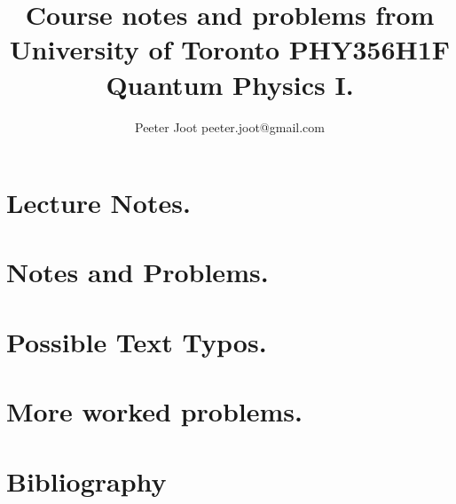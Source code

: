 \documentclass[12pt,leqno]{book}
\begin{document}

\title{Course notes and problems from\\University of Toronto PHY356H1F\\Quantum Physics I.}
\author{Peeter Joot \quad peeter.joot@gmail.com}

\maketitle

\clearpage{}
\tableofcontents

\clearpage{}

\pagestyle{plain}




\part{Lecture Notes.}


\part{Notes and Problems.}














\part{Possible Text Typos.}


\part{More worked problems.}








%
\part{Bibliography}




\end{document}

